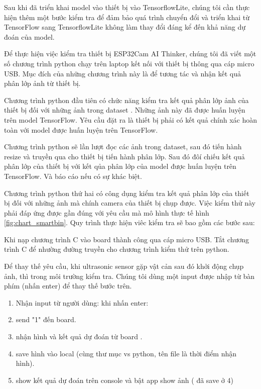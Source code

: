 Sau khi đã triển khai model vào thiết bị vào TensorflowLite, chúng tôi cần thực hiện thêm một bước kiểm tra để đảm bảo quá trình chuyển đổi và triển khai từ TensorFlow sang TensorflowLite không làm thay đổi đáng kể đến khả năng dự đoán của model.

Để thực hiện việc kiểm tra thiết bị ESP32Cam AI Thinker, chúng tôi đã viết một số chương trình python chạy trên laptop kết nối với thiết bị thông qua cáp micro USB. Mục đích của những chương trình này là để tương tác và nhận kết quả phân lớp ảnh từ thiết bị.

Chương trình python đầu tiên có chức năng kiểm tra kết quả phân lớp ảnh của thiết bị đối với những ảnh trong dataset \cite{trashnet}. Những ảnh này đã được huấn luyện trên model TensorFlow. Yêu cầu đặt ra là thiết bị phải có kết quả chính xác hoàn toàn với model được huấn luyện trên TensorFlow.

Chương trình python sẽ lần lượt đọc các ảnh trong dataset, sau đó tiến hành resize và truyền qua cho thiết bị tiến hành phân lớp. Sau đó đôí chiếu kết quả phân lớp của thiết bị với kết qủa phân lớp của model được huấn luyện trên TensorFlow. Và báo cáo nếu có sự khác biệt.

Chương trình python thứ hai có công dụng kiểm tra kết quả phân lớp của thiết bị đối với những ảnh mà chính camera của thiết bị chụp được. Việc kiểm thử này phải đáp ứng được gần đúng với yêu cầu mà mô hình thực tế hình \ref{fig:chart_smartbin}. Quy trình thực hiện viêc kiểm tra sẽ bao gồm các bước sau:

Khi nạp chương trình C vào board thành công qua cáp micro USB. Tắt chương trình C để nhường đường truyền cho chương trình kiểm thử trên python.

Để thay thế yêu cầu, khi ultrasonic sensor gặp vật cản sau đó khởi động chụp ảnh, thì trong môi trường kiểm tra. Chúng tôi dùng một input được nhập từ bàn phím (nhấn enter) để thay thế bước trên. 
\begin{enumerate}
    \item Nhận input từ người dùng: khi nhấn enter: 
    \item send "1" đến  board.
    \item nhận hình và kết quả dự đoán từ board .
    \item save hình vào local (cùng thư mục vs python, tên file là thời điểm nhận hình).
    \item show kết quả dự đoán trên console và bật app show ảnh ( đã save ở 4)
\end{enumerate}

